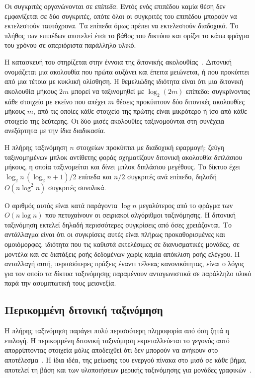 Οι συγκριτές οργανώνονται σε \emph{επίπεδα}. Εντός ενός επιπέδου καμία θέση δεν
εμφανίζεται σε δύο συγκριτές, οπότε όλοι οι συγκριτές του επιπέδου μπορούν να
εκτελεστούν ταυτόχρονα. Τα επίπεδα όμως πρέπει να εκτελεστούν διαδοχικά. Το
πλήθος των επιπέδων αποτελεί έτσι το βάθος του δικτύου και ορίζει το κάτω φράγμα
του χρόνου σε απεριόριστα παράλληλο υλικό.

Η κατασκευή του  στηρίζεται στην έννοια της διτονικής
ακολουθίας~\cite{batcher1968}. Διτονική ονομάζεται μια ακολουθία που πρώτα
αυξάνει και έπειτα μειώνεται, ή που προκύπτει από μια τέτοια με κυκλική
ολίσθηση. Η θεμελιώδης ιδιότητα είναι ότι μια διτονική ακολουθία μήκους $2m$
μπορεί να ταξινομηθεί με $\log_2(2m)$ επίπεδα: συγκρίνοντας κάθε στοιχείο με
εκείνο που απέχει $m$ θέσεις προκύπτουν δύο διτονικές ακολουθίες μήκους $m$, από
τις οποίες κάθε στοιχείο της πρώτης είναι μικρότερο ή ίσο από κάθε στοιχείο της
δεύτερης. Οι δύο μισές ακολουθίες ταξινομούνται στη συνέχεια ανεξάρτητα με την
ίδια διαδικασία.

Η πλήρης ταξινόμηση $n$ στοιχείων προκύπτει με διαδοχική εφαρμογή: ζεύγη
ταξινομημένων μπλοκ αντίθετης φοράς σχηματίζουν διτονική ακολουθία διπλάσιου
μήκους, η οποία ταξινομείται και δίνει μπλοκ διπλάσιου μεγέθους. Το δίκτυο έχει
$\log_2 n \, (\log_2 n + 1)/2$ επίπεδα και $n/2$ συγκριτές ανά επίπεδο, δηλαδή
$O(n \log^2 n)$ συγκριτές συνολικά.

Ο αριθμός αυτός είναι κατά παράγοντα $\log n$ μεγαλύτερος από το φράγμα των
$O(n \log n)$ που πετυχαίνουν οι σειριακοί αλγόριθμοι ταξινόμησης. Η διτονική
ταξινόμηση εκτελεί δηλαδή περισσότερες συγκρίσεις από όσες χρειάζονται. Το
αντάλλαγμα είναι ότι οι συγκρίσεις αυτές είναι πλήρως προκαθορισμένες και
ομοιόμορφες, ιδιότητα που τις καθιστά εκτελέσιμες σε διανυσματικές μονάδες, σε
μοντέλα  και σε διατάξεις ροής δεδομένων χωρίς καμία απόκλιση ροής
ελέγχου. Η ανταλλαγή αυτή, περισσότερες πράξεις έναντι τέλειας
κανονικότητας, είναι ο λόγος για τον οποίο τα δίκτυα ταξινόμησης παραμένουν
ανταγωνιστικά σε παράλληλο υλικό παρά την ασυμπτωτική τους μειονεξία.

\subsection{Περικομμένη διτονική ταξινόμηση}
\label{sec:bg-truncated-bitonic}

Η πλήρης ταξινόμηση παράγει πολύ περισσότερη πληροφορία από όση ζητά η επιλογή.
Η περικομμένη διτονική ταξινόμηση εκμεταλλεύεται το γεγονός αυτό απορρίπτοντας
στοιχεία μόλις αποδειχθεί ότι δεν μπορούν να ανήκουν στο
αποτέλεσμα~\cite{sismanis2012}. Η ίδια ιδέα, της μείωσης του ενεργού πίνακα στο
μισό σε κάθε βήμα, αποτελεί τη βάση και των υλοποιήσεων μερικής ταξινόμησης για
μονάδες γραφικών~\cite{shanbhag2018}.

